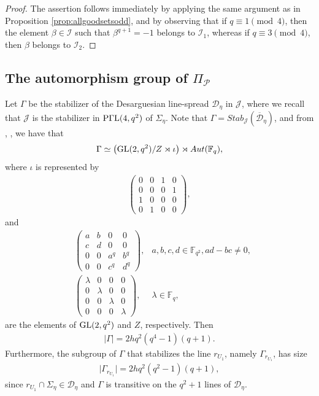 \documentclass[11pt]{article}
\theoremstyle{definition}
\numberwithin{equation}{section}
\def\cJ{\mathcal J}
\def\cP{\mathcal P}
\def\cD{\mathcal D}
\def\F{{\mathbb F}}
\def\GL{{\rm GL}}
\def\PGaL{{\rm P\Gamma L}}
\begin{document}
\begin{proof}
The assertion follows immediately by applying the same argument as in Proposition \ref{prop:allgoodsetsodd}, and by observing that if $q \equiv 1 \pmod{4}$, then the element $\beta \in \mathcal{I}$ such that $\beta^{q+1}=-1$ belongs to $\mathcal{I}_1$, whereas if $q \equiv 3 \pmod{4}$, then $\beta$ belongs to $\mathcal{I}_2$.
\end{proof} 

\subsection{The automorphism group of \texorpdfstring{$\Pi_{\cP}$}{Pi}} \label{subse:automorphis}

Let $\Gamma$ be the stabilizer of the Desarguesian line-spread $\cD_{\eta}$ in $\cJ$, where we recall that $\cJ$ is the stabilizer in $\PGaL(4, q^2)$ of $\Sigma_{\eta}$. Note that $\Gamma = Stab_{\cJ}\left(\overline{\cD}_{\eta}\right)$, and from \cite{dye1991spreads}, \cite{van2016desarguesian}, we have that 
\begin{align*}
    \Gamma \simeq \left(\GL(2, q^2)/Z \rtimes \iota \right) \rtimes Aut(\F_q),
\end{align*}
where $\iota$ is represented by 
\begin{align*}
\begin{pmatrix}
0 & 0 & 1 & 0 \\
0 & 0 & 0 & 1 \\
1 & 0 & 0 & 0 \\
0 & 1 & 0 & 0 
\end{pmatrix},
\end{align*}
and 
\begin{align*}
    & \begin{pmatrix}
        a & b & 0 & 0 \\
        c & d & 0 & 0 \\
        0 & 0 & a^q & b^q \\
        0 & 0 & c^q & d^q
    \end{pmatrix}, & a,b,c,d \in \F_{q^2}, ad-bc \ne 0, \\
    & \begin{pmatrix}
        \lambda & 0 & 0 & 0 \\
        0 & \lambda & 0 & 0 \\
        0 & 0 & \lambda & 0 \\
        0 & 0 & 0 & \lambda
    \end{pmatrix}, & \lambda \in \F_{q}, 
\end{align*}
are the elements of $\GL(2, q^2)$ and $Z$, respectively. Then 
\begin{align*}
    \lvert \Gamma \rvert = 2hq^2(q^4-1)(q+1).
\end{align*}
Furthermore, the subgroup of $\Gamma$ that stabilizes the line $r_{U_1}$, namely  $\Gamma_{r_{U_1}}$, has size
\begin{align*}
    \lvert \Gamma_{r_{U_1}} \rvert = 2hq^2(q^2-1)(q+1),
\end{align*}
since $r_{U_1} \cap \Sigma_{\eta} \in \cD_{\eta}$ and $\Gamma$ is transitive on the $q^2+1$ lines of $\cD_{\eta}$.
\end{document}
